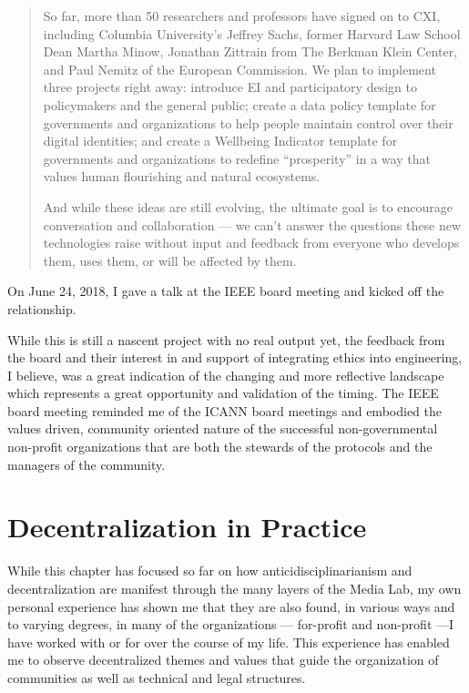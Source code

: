 \begin{quotation}
So far, more than 50 researchers and professors have signed on to CXI, including Columbia University's Jeffrey Sachs, former Harvard Law School Dean Martha Minow, Jonathan Zittrain from The Berkman Klein Center, and Paul Nemitz of the European Commission. We plan to implement three projects right away: introduce \ac{EI} and participatory design to policymakers and the general public; create a data policy template for governments and organizations to help people maintain control over their digital identities; and create a Wellbeing Indicator template for governments and organizations to redefine ``prosperity'' in a way that values human flourishing and natural ecosystems.

And while these ideas are still evolving, the ultimate goal is to encourage conversation and collaboration --- we can’t answer the questions these new technologies raise without input and feedback from everyone who develops them, uses them, or will be affected by them.
\end{quotation}

On June 24, 2018, I gave a talk at the \ac{IEEE} board meeting and kicked off the relationship.

While this is still a nascent project with no real output yet, the feedback from the board and their interest in and support of integrating ethics into engineering, I believe, was a great indication of the changing and more reflective landscape which represents a great opportunity and validation of the timing. The \ac{IEEE} board meeting reminded me of the \ac{ICANN} board meetings and embodied the values driven, community oriented nature of the successful non-governmental non-profit organizations that are both the stewards of the protocols and the managers of the community.


\section{Decentralization in Practice}
\label{decentralizationpractice}

While this chapter has focused so far on how anticidisciplinarianism and decentralization are manifest through the many layers of the Media Lab, my own personal experience has shown me that they are also found, in various ways and to varying degrees, in many of the organizations --- for-profit and non-profit ---I have worked with or for over the course of my life. This experience has enabled me to observe decentralized themes and values that guide the organization of communities as well as technical and legal structures.

